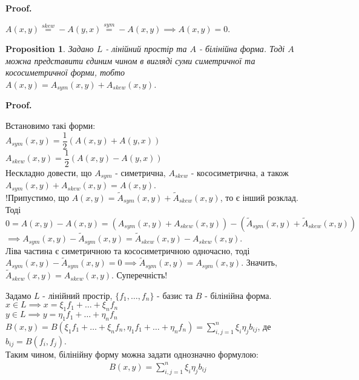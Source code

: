 \documentclass[a4paper, 10pt]{article}
\makeatletter
\def\huge{\displaystyle}
\def\qed{$\blacksquare$}
\theoremstyle{theoremdd}
\theoremstyle{theoremdd}
\theoremstyle{theoremdd}
\theoremstyle{theoremdd}
\theoremstyle{theoremdd}
\newtheorem{proposition}[theorem]{Proposition}
\theoremstyle{theoremdd}
\theoremstyle{theoremdd}
\theoremstyle{theoremdd}
\renewenvironment{proof}[1][Proof.\\]{\par
\pushQED{\hfill \qed}%
\normalfont \topsep6\p@\@plus6\p@\relax
\trivlist
\item\relax
{\bfseries
#1\@addpunct{.}}\hspace\labelsep\ignorespaces
}{%
\popQED\endtrivlist\@endpefalse
}
\makeatother
\begin{document}
\begin{proof}
$A(x,y) \overset{skew}{=} -A(y,x) \overset{sym}{=} -A(x,y) \implies A(x,y) = 0$.
\end{proof}

\begin{proposition}
Задано $L$ - лінійний простір та $A$ - білінійна форма. Тоді $A$ можна представити єдиним чином в вигляді суми симетричної та кососиметричної форми, тобто\\
$A(x,y) = A_{sym}(x,y) + A_{skew}(x,y)$.
\end{proposition}

\begin{proof}
Встановимо такі форми: \\
$A_{sym}(x,y) = \dfrac{1}{2} \left( A(x,y) + A(y,x) \right)$ \\
$A_{skew}(x,y) = \dfrac{1}{2} \left( A(x,y) - A(y,x) \right)$ \\
Нескладно довести, що $A_{sym}$ - симетрична, $A_{skew}$ - кососиметрична, а також \\ $A_{sym}(x,y) + A_{skew}(x,y) = A(x,y)$.
\bigskip \\
!Припустимо, що $A(x,y) = \tilde{A}_{sym}(x,y) + \tilde{A}_{skew}(x,y)$, то є інший розклад. Тоді\\
$0 = A(x,y) - A(x,y) = (A_{sym}(x,y) + A_{skew}(x,y)) - (\tilde{A}_{sym}(x,y) + \tilde{A}_{skew}(x,y))$\\
$\implies A_{sym}(x,y) - \tilde{A}_{sym}(x,y) = \tilde{A}_{skew}(x,y) - A_{skew}(x,y)$.\\
Ліва частина є симетричною та кососиметричною одночасно, тоді $A_{sym}(x,y) - \tilde{A}_{sym}(x,y) = 0 \implies \tilde{A}_{sym}(x,y) = A_{sym}(x,y)$. Значить, $\tilde{A}_{skew}(x,y) = A_{skew}(x,y)$. Суперечність!
\end{proof}

Задамо $L$ - лінійний простір, $\{f_1,\dots,f_n\}$ - базис та $B$ - білінійна форма.\\
$x \in L \implies x = \xi_1 f_1 + \dots + \xi_n f_n$\\
$y \in L \implies y = \eta_1 f_1 + \dots + \eta_n f_n$\\
$B(x,y) = B(\xi_1 f_1 + \dots + \xi_n f_n, \eta_1 f_1 + \dots + \eta_n f_n) = \huge\sum_{i,j=1}^n \xi_i \eta_j b_{ij}$, де $b_{ij} = B(f_i,f_j)$.\\
Таким чином, білінійну форму можна задати однозначно формулою:
\begin{align*}
B(x,y) = \sum_{i,j=1}^n \xi_i \eta_j b_{ij}
\end{align*}
\end{document}
